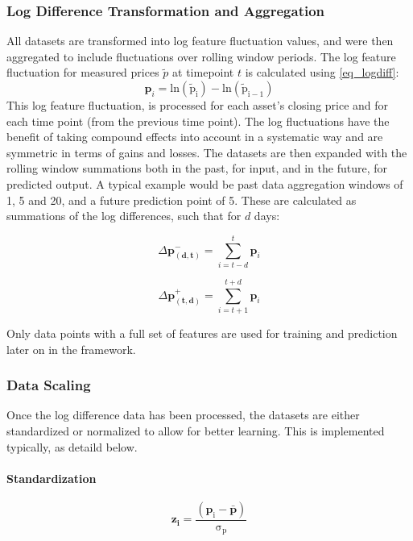 \documentclass[a4paper,11pt,oneside]{article}
\theoremstyle{plain}
\theoremstyle{definition}
\begin{document}
	\subsubsection{Log Difference Transformation and Aggregation}\label{ldata_og_difference}
	All datasets are transformed into log feature fluctuation values, and were then aggregated to include fluctuations over rolling window periods. The log feature fluctuation for measured prices $\tilde{p}$ at timepoint $t$ is calculated using \eqref{eq_logdiff}:
	\begin{equation}\label{eq_logdiff}
	\mathbf{p}_i = \mathrm{ln(\tilde{p}_i) - \mathrm{ln}(\tilde{p}_{i-1})}
	\end{equation}
	This log feature fluctuation,  is processed for each asset's closing price and for each time point (from the previous time point). The log fluctuations have the benefit of taking compound effects into account in a systematic way and are symmetric in terms of gains and losses.
	\newline\newline
	The datasets are then expanded with the rolling window summations both in the past, for input, and in the future, for predicted output. A typical example would be past data aggregation windows of 1, 5 and 20, and a future prediction point of 5. These are calculated as summations of the log differences, such that for $d$ days:
	
	\begin{equation}
	\Delta \mathbf{p^{-}_{(d,t)}} = \sum_{i = t-d}^{t} \mathbf{p}_i
	\end{equation}
	
	\begin{equation}
	\Delta \mathbf{p^{+}_{(t,d)}} = \sum_{i = t+1}^{t+d} \mathbf{p}_i
	\end{equation}
	
	Only data points with a full set of features are used for training and prediction later on in the framework.
	
	\subsubsection{Data Scaling}\label{data_scaling}
	Once the log difference data has been processed, the datasets are either standardized or normalized to allow for better learning. This is implemented typically, as detaild below.
	
	\paragraph{Standardization}
	\begin{equation}
	\mathbf{z_i}= \mathrm{\frac{(\mathbf{p}_i - \mathbf{\bar{p}}) }{\sigma_p}}
	\end{equation}
	
\end{document}

